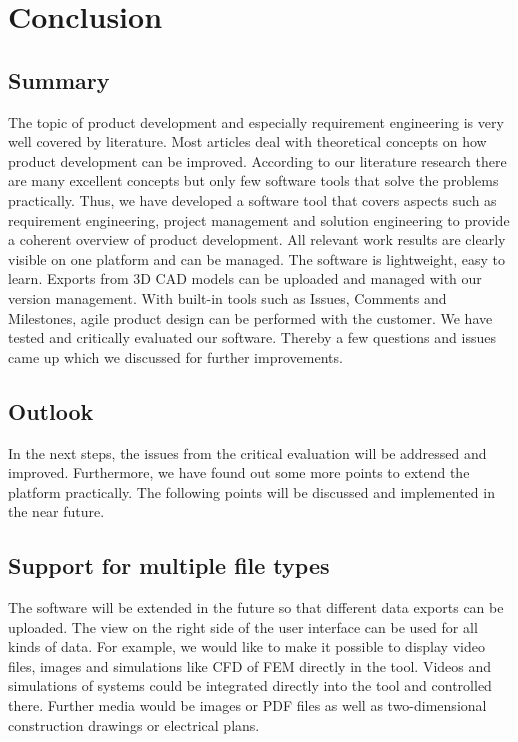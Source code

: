 \section{Conclusion}
\label{sec:conclusion}

\subsection*{Summary} 
The topic of product development and especially requirement engineering is very well covered by literature. Most articles deal with theoretical concepts on how product development can be improved. According to our literature research there are many excellent concepts but only few software tools that solve the problems practically. Thus, we have developed a software tool that covers aspects such as requirement engineering, project management and solution engineering to provide a coherent overview of product development. All relevant work results are clearly visible on one platform and can be managed. The software is lightweight, easy to learn. Exports from 3D CAD models can be uploaded and managed with our version management. With built-in tools such as Issues, Comments and Milestones, agile product design can be performed with the customer. We have tested and critically evaluated our software. Thereby a few questions and issues came up which we discussed for further improvements.

\subsection*{Outlook}
In the next steps, the issues from the critical evaluation will be addressed and improved. Furthermore, we have found out some more points to extend the platform practically. The following points will be discussed and implemented in the near future.

\subsection*{Support for multiple file types}
The software will be extended in the future so that different data exports can be uploaded. The view on the right side of the user interface can be used for all kinds of data. For example, we would like to make it possible to display video files, images and simulations like CFD of FEM directly in the tool. Videos and simulations of systems could be integrated directly into the tool and controlled there. Further media would be images or PDF files as well as two-dimensional construction drawings or electrical plans.

